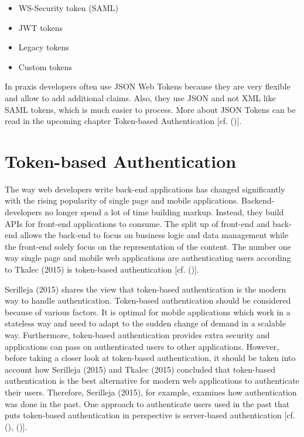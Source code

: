 \begin{itemize}
	\item WS-Security token (SAML)
	\item JWT tokens
	\item Legacy tokens
	\item Custom tokens
\end{itemize}

In praxis developers often use JSON Web Tokens because they are very flexible and allow to add additional claims. Also, they use JSON and not XML like SAML tokens, which is much easier to process. More about JSON Tokens can be read in the upcoming chapter Token-based Authentication [cf. (\cite{Spencer:2018:APISecurity})].

\section{Token-based Authentication}
\label{tokenBasedAuthentication}

The way web developers write back-end applications has changed significantly with the rising popularity of single page and mobile applications. Backend-developers no longer spend a lot of time building markup. Instead, they build APIs for front-end applications to consume. The split up of front-end and back-end allows the back-end to focus on business logic and data management while the front-end solely focus on the representation of the content. The number one way single page and mobile web applications are authenticating users according to Tkalec (2015) is token-based authentication [cf. (\cite{Tkalec:2015})].  

Serilleja (2015) shares the view that token-based authentication is the modern way to handle authentication. Token-based authentication should be considered because of various factors. It is optimal for mobile applications which work in a stateless way and need to adapt to the sudden change of demand in a scalable way. Furthermore, token-based authentication provides extra security and applications can pass on authenticated users to other applications. However, before taking a closer look at token-based authentication, it should be taken into account how Serilleja (2015) and Tkalec (2015) concluded that token-based authentication is the best alternative for modern web applications to authenticate their users. Therefore, Serilleja (2015), for example, examines how authentication was done in the past. One approach to authenticate users used in the past that puts token-based authentication in perspective is server-based authentication [cf. (\cite{Serilleja:2015:Scothio}), (\cite{Tkalec:2015})]. 

